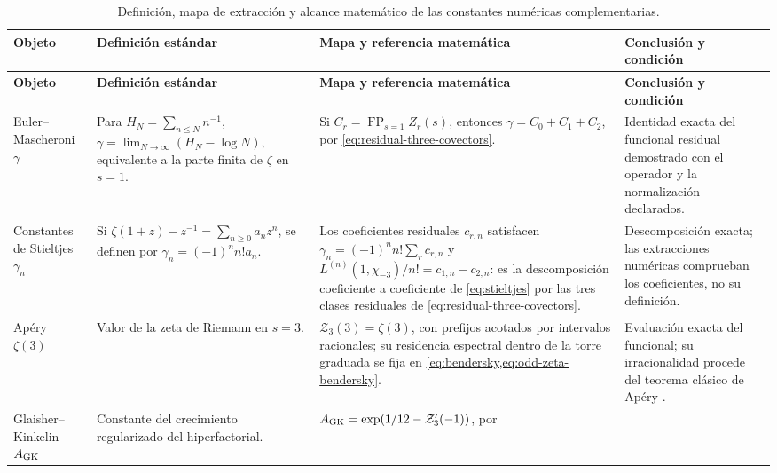 \newpage
\enlargethispage{2\baselineskip}
\begingroup
\small
\fontsize{10pt}{11.2pt}\selectfont
\setlength{\LTpre}{0.5\baselineskip}
\setlength{\LTpost}{0.5\baselineskip}
\begin{longtable}{@{}>{\raggedright\arraybackslash}p{}
                    >{\raggedright\arraybackslash}p{}
                    >{\raggedright\arraybackslash}p{}
                    >{\raggedright\arraybackslash}p{}@{}}
\caption{Definici\'on, mapa de extracci\'on y alcance matem\'atico de las
constantes num\'ericas complementarias.}
\label{p3-83-c44-s1:tab:constantes-operadores-ontologia-rev11}\\
\toprule
\textbf{Objeto} & \textbf{Definici\'on est\'andar} &
\textbf{Mapa y referencia matem\'atica} & \textbf{Conclusi\'on y condici\'on}\\
\midrule
\endfirsthead
\toprule
\textbf{Objeto} & \textbf{Definici\'on est\'andar} &
\textbf{Mapa y referencia matem\'atica} & \textbf{Conclusi\'on y condici\'on}\\
\midrule
\endhead
Euler--Mascheroni \(\gamma\) &
Para \(H_N=\sum_{n\leq N}n^{-1}\),
\(\gamma=\lim_{N\to\infty}(H_N-\log N)\), equivalente a la parte finita de
\(\zeta\) en \(s=1\). &
Si \(C_r=\operatorname*{FP}_{s=1}Z_r(s)\), entonces
\(\gamma=C_0+C_1+C_2\), por
\eqref{eq:residual-three-covectors}. &
Identidad exacta del funcional residual demostrado con el operador y la
normalizaci\'on declarados.\\
Constantes de Stieltjes \(\gamma_n\) &
Si \(\zeta(1+z)-z^{-1}=\sum_{n\geq0}a_nz^n\), se definen por
\(\gamma_n=(-1)^n n!a_n\). &
Los coeficientes residuales \(c_{r,n}\) satisfacen
\(\gamma_n=(-1)^n n!\sum_r c_{r,n}\) y
\(L^{(n)}(1,\chi_{-3})/n!=c_{1,n}-c_{2,n}\): es la descomposición
coeficiente a coeficiente de \eqref{eq:stieltjes} por las tres clases
residuales de \eqref{eq:residual-three-covectors}. &
Descomposici\'on exacta; las extracciones num\'ericas comprueban los
coeficientes, no su definici\'on.\\
Ap\'ery \(\zeta(3)\) &
Valor de la zeta de Riemann en \(s=3\). &
\(\mathcal Z_3(3)=\zeta(3)\), con prefijos acotados por intervalos racionales;
su residencia espectral dentro de la torre graduada se fija en
\cref{eq:bendersky,eq:odd-zeta-bendersky}. &
Evaluaci\'on exacta del funcional; su irracionalidad procede del teorema
cl\'asico de Ap\'ery \cite{Apery1979}.\\
Glaisher--Kinkelin \(A_{\rm GK}\) &
Constante del crecimiento regularizado del hiperfactorial. &
\(A_{\rm GK}=\exp(1/12-\mathcal Z_3'(-1))\), por

\end{longtable}
